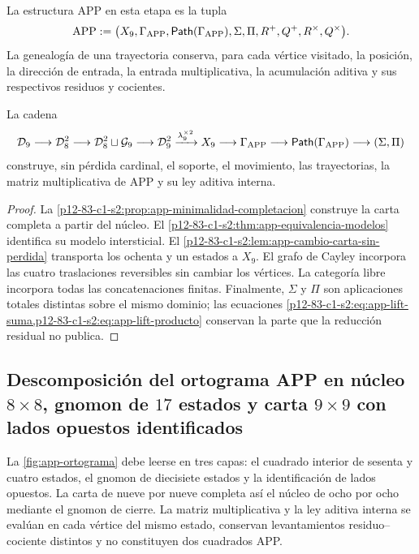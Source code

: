 \begin{definition}
\label{p12-83-c1-s2:def:app-genealogica-autonoma}
La estructura APP en esta etapa es la tupla
\[
 \operatorname{APP}:=
 \bigl(
  X_9,
  \Gamma_{\rm APP},
  \mathsf{Path}(\Gamma_{\rm APP}),
  \Sigma,\Pi,
  R^+,Q^+,R^\times,Q^\times
 \bigr).
\]
La genealogía de una trayectoria conserva, para cada vértice visitado, la
posición, la dirección de entrada, la entrada multiplicativa, la acumulación
aditiva y sus respectivos residuos y cocientes.
\end{definition}

\begin{theorem}
\label{p12-83-c1-s2:thm:app-cadena-constructiva-autonoma}
La cadena
\[
 \mathcal D_9
 \longrightarrow
 \mathcal D_8^2
 \longrightarrow
 \mathcal D_8^2\sqcup\mathcal G_9
 \longrightarrow
 \mathcal D_9^2
 \xrightarrow{\lambda_9^{\times2}}
 X_9
 \longrightarrow
 \Gamma_{\rm APP}
 \longrightarrow
 \mathsf{Path}(\Gamma_{\rm APP})
 \longrightarrow
 (\Sigma,\Pi)
\]
construye, sin pérdida cardinal, el soporte, el movimiento, las trayectorias,
la matriz multiplicativa de APP y su ley aditiva interna.
\end{theorem}

\begin{proof}
La \cref{p12-83-c1-s2:prop:app-minimalidad-completacion} construye la carta completa a
partir del núcleo. El \cref{p12-83-c1-s2:thm:app-equivalencia-modelos} identifica su
modelo intersticial. El \cref{p12-83-c1-s2:lem:app-cambio-carta-sin-perdida} transporta
los ochenta y un estados a \(X_9\). El grafo de Cayley incorpora las cuatro
traslaciones reversibles sin cambiar los vértices. La categoría libre
incorpora todas las concatenaciones finitas. Finalmente, \(\Sigma\) y
\(\Pi\) son aplicaciones totales distintas sobre el mismo dominio; las
ecuaciones \cref{p12-83-c1-s2:eq:app-lift-suma,p12-83-c1-s2:eq:app-lift-producto} conservan la parte
que la reducción residual no publica.
\end{proof}

\subsection{Descomposición del ortograma APP en núcleo \(8\times8\), gnomon de \(17\) estados y carta \(9\times9\) con lados opuestos identificados}

La \cref{fig:app-ortograma} debe leerse en tres capas: el cuadrado interior
de sesenta y cuatro estados, el gnomon de diecisiete estados y la
identificación de lados opuestos. La carta de nueve por nueve completa así el
núcleo de ocho por ocho mediante el gnomon de cierre. La matriz
multiplicativa y la ley aditiva interna se evalúan en cada vértice del mismo
estado, conservan levantamientos residuo--cociente distintos y no constituyen
dos cuadrados APP.

